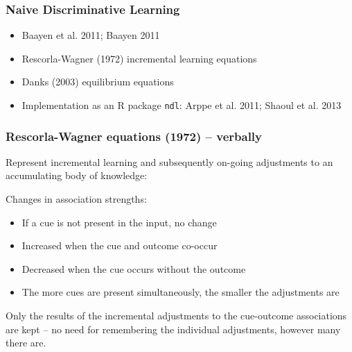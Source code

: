 \begin{frame}
  \frametitle{Naive Discriminative Learning}
  
  \begin{itemize}
  
  \item Baayen et al. 2011; Baayen 2011

  \item Rescorla-Wagner (1972) incremental learning equations

  \item Danks (2003) equilibrium equations

  \item Implementation as an R package \texttt{ndl}: Arppe et
    al. 2011; Shaoul et al. 2013

\end{itemize}    

\end{frame}

\begin{frame}
\frametitle{Rescorla-Wagner equations (1972) -- verbally}

Represent incremental learning and subsequently on-going adjustments
to an accumulating body of knowledge:

Changes in association strengths:
\begin{itemize}
	\item If a cue is not present in the input, no change
	\item Increased when the cue and outcome co-occur
	\item Decreased when the cue occurs without the outcome
	\item The more cues are present simultaneously, the smaller the adjustments are 
\end{itemize}

Only the results of the incremental adjustments to the cue-outcome
associations are kept -- no need for remembering the individual
adjustments, however many there are.

\end{frame}

